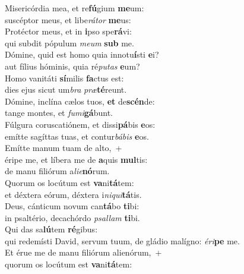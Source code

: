 \evenverse Misericórdia mea, et re\textbf{fú}gium \textbf{me}um:~\*\\
\evenverse suscéptor meus, et libe\textit{rá}\textit{tor} \textbf{me}us:\\
\oddverse Protéctor meus, et in \textbf{i}pso spe\textbf{rá}vi:~\*\\
\oddverse qui subdit pópulum \textit{me}\textit{um} \textbf{sub} me.\\
\evenverse Dómine, quid est homo quia innotu\textbf{í}sti \textbf{e}i?~\*\\
\evenverse aut fílius hóminis, quia ré\textit{pu}\textit{tas} \textbf{e}um?\\
\oddverse Homo vanitáti \textbf{sí}milis \textbf{fa}ctus est:~\*\\
\oddverse dies ejus sicut um\textit{bra} \textit{præ}\textbf{té}reunt.\\
\evenverse Dómine, inclína cælos tuos, \textbf{et} de\textbf{scén}de:~\*\\
\evenverse tange montes, et \textit{fu}\textit{mi}\textbf{gá}bunt.\\
\oddverse Fúlgura coruscatiónem, et dissi\textbf{pá}bis \textbf{e}os:~\*\\
\oddverse emítte sagíttas tuas, et contur\textit{bá}\textit{bis} \textbf{e}os.\\
\evenverse Emítte manum tuam de alto,~+\\
\evenverse  éripe me, et líbera me de \textbf{a}quis \textbf{mul}tis:~\*\\
\evenverse de manu filiórum a\textit{li}\textit{e}\textbf{nó}rum.\\
\oddverse Quorum os locútum est \textbf{va}ni\textbf{tá}tem:~\*\\
\oddverse et déxtera eórum, déxtera i\textit{ni}\textit{qui}\textbf{tá}tis.\\
\evenverse Deus, cánticum novum can\textbf{tá}bo \textbf{ti}bi:~\*\\
\evenverse in psaltério, decachórdo \textit{psal}\textit{lam} \textbf{ti}bi.\\
\oddverse Qui das sa\textbf{lú}tem \textbf{ré}gibus:~\*\\
\oddverse qui redemísti David, servum tuum, de gládio malígno: \textit{é}\textit{ri}\textbf{pe} me.\\
\evenverse Et érue me de manu filiórum alienórum,~+\\
\evenverse  quorum os locútum est \textbf{va}ni\textbf{tá}tem:~\*\\
